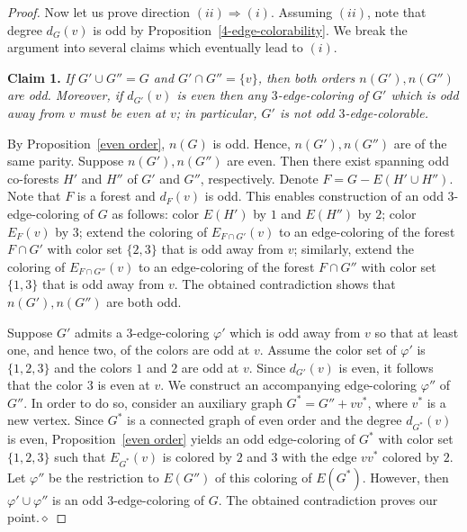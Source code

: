 \documentclass[a4paper,12pt]{article}
\numberwithin{equation}{section}
\begin{document}
\begin{proof}
\medskip

Now let us prove direction $(ii)\Rightarrow(i)$. Assuming $(ii)$, note that degree $d_G(v)$ is odd by Proposition~\ref{4-edge-colorability}. We break the argument into several claims  which eventually lead to $(i)$.

\bigskip

\noindent \textbf{Claim 1.} \textit{If $G'\cup G''=G$ and $G'\cap G''=\{v\}$, then both orders $n(G'),n(G'')$ are odd. Moreover, if $d_{G'}(v)$ is even then any $3$-edge-coloring of $G'$ which is odd away from $v$ must be even at $v$; in particular, $G'$ is not odd $3$-edge-colorable.}

\medskip

\noindent By Proposition~\ref{even order}, $n(G)$ is odd. Hence, $n(G'),n(G'')$ are of the same parity. Suppose $n(G'),n(G'')$ are even. Then there exist spanning odd co-forests $H'$ and $H''$ of $G'$ and $G''$, respectively. Denote $F=G-E(H'\cup H'')$. Note that $F$ is a forest and $d_F(v)$ is odd. This enables construction of an odd $3$-edge-coloring of $G$ as follows: color $E(H')$ by $1$ and $E(H'')$ by $2$; color $E_F(v)$ by $3$; extend the coloring of $E_{F\cap G'}(v)$ to an edge-coloring of the forest $F\cap G'$ with color set $\{2,3\}$ that is odd away from $v$; similarly, extend the coloring of $E_{F\cap G''}(v)$ to an edge-coloring of the forest $F\cap G''$ with color set $\{1,3\}$ that is odd away from $v$. The obtained contradiction shows that $n(G'),n(G'')$ are both odd.

Suppose $G'$ admits a $3$-edge-coloring $\varphi'$ which is odd away from $v$ so that at least one, and hence two, of the colors are odd at $v$.
Assume the color set of $\varphi'$ is $\{1,2,3\}$ and the colors $1$ and $2$ are odd at $v$. Since $d_{G'}(v)$ is even, it follows that the color $3$ is even at $v$. We construct an accompanying edge-coloring $\varphi''$ of $G''$. In order to do so, consider an auxiliary graph $G^*=G''+vv^*$, where $v^*$ is a new vertex. Since $G^*$ is a connected graph of even order and the degree $d_{G^*}(v)$ is even, Proposition~\ref{even order} yields an odd edge-coloring of $G^*$ with color set $\{1,2,3\}$ such that $E_{G^*}(v)$ is colored by $2$ and $3$ with the edge $vv^*$ colored by $2$. Let $\varphi''$ be the restriction to $E(G'')$ of this coloring of $E(G^*)$. However, then $\varphi'\cup\varphi''$ is an odd $3$-edge-coloring of $G$. The obtained contradiction proves our point.\hfill$\diamond$

\bigskip


\end{proof}
\end{document}
